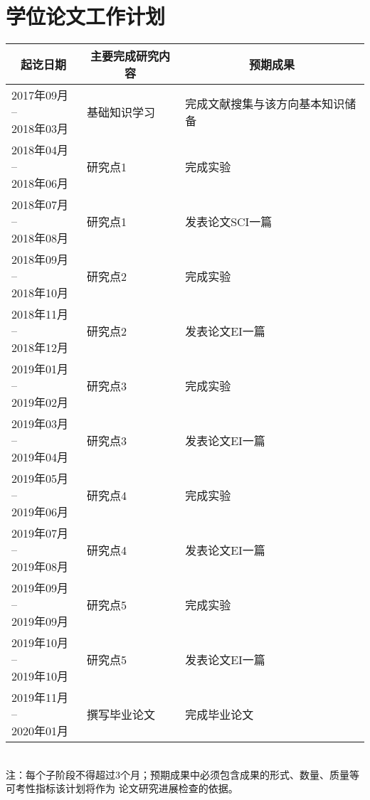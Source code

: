 



\section{学位论文工作计划}
{
\noindent
\begin{tabular*}{0.999\textwidth}{| p{ } <{\centering} | p{}  | p{}  |}

	\hline 
	\multicolumn{1}{|c|}{起讫日期} & 	\multicolumn{1}{c}{主要完成研究内容} & 	\multicolumn{1}{|c|}{预期成果} \\
	\hline 
	\tabincell{c}{2017年09月 -- \\2018年03月}   &  基础知识学习 &   完成文献搜集与该方向基本知识储备 \\ 
	\hline 
	\tabincell{c}{2018年04月 -- \\2018年06月} &  研究点1 &   完成实验 \\ 
	\hline 
	\tabincell{c}{2018年07月 -- \\2018年08月} &  研究点1 &   发表论文SCI一篇 \\ 
	\hline 
	\tabincell{c}{2018年09月 -- \\2018年10月} &  研究点2 &   完成实验 \\ 
	\hline 
    \tabincell{c}{2018年11月 -- \\2018年12月} &  研究点2 &   发表论文EI一篇 \\ 
    \hline 
    \tabincell{c}{2019年01月 -- \\2019年02月} &  研究点3 &   完成实验 \\ 
    \hline 
    \tabincell{c}{2019年03月 -- \\2019年04月} &  研究点3 &   发表论文EI一篇 \\ 
    \hline 
    \tabincell{c}{2019年05月 -- \\2019年06月} &  研究点4 &   完成实验 \\ 
    \hline 
    \tabincell{c}{2019年07月 -- \\2019年08月} &  研究点4 &   发表论文EI一篇 \\ 
    \hline 
    \tabincell{c}{2019年09月 -- \\2019年09月} &  研究点5 &   完成实验 \\ 
    \hline 
    \tabincell{c}{2019年10月 -- \\2019年10月} &  研究点5 &   发表论文EI一篇 \\ 
    \hline 
	\tabincell{c}{2019年11月 -- \\2020年01月} &  撰写毕业论文 &  完成毕业论文 \\ 
	\hline 
\end{tabular*} 
\\[1 cm]
{\songti 注：每个子阶段不得超过3个月；预期成果中必须包含成果的形式、数量、质量等可考性指标该计划将作为
论文研究进展检查的依据。}
\indent
}



